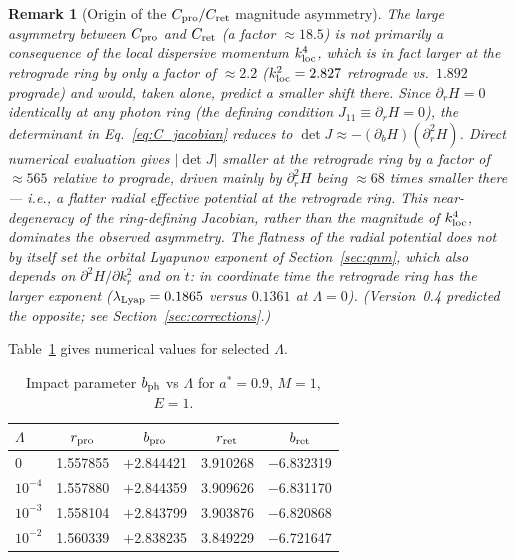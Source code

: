 \documentclass[12pt,a4paper]{article}
\newtheorem{remark}{Remark}
\newcommand{\lLyap}{\lambda_{\rm Lyap}}
\begin{document}
\begin{remark}[Origin of the $C_{\rm pro}/C_{\rm ret}$ magnitude asymmetry]
\label{rem:asymmetry}
The large asymmetry between $C_{\rm pro}$ and $C_{\rm ret}$
(a factor $\approx18.5$) is \emph{not} primarily a consequence of the
local dispersive momentum $k_{\rm loc}^4$, which is in fact larger
at the retrograde ring by only a factor of $\approx2.2$
($k_{\rm loc}^2=2.827$ retrograde vs.\ $1.892$ prograde) and would,
taken alone, predict a \emph{smaller} shift there. Since
$\partial_r H=0$ identically at any photon ring
(the defining condition $J_{11}\equiv\partial_r H=0$), the
determinant in Eq.~\eqref{eq:C_jacobian} reduces to
$\det J\approx-(\partial_b H)(\partial_r^2 H)$. Direct numerical
evaluation gives $|\det J|$ smaller at the retrograde ring by a
factor of $\approx565$ relative to prograde, driven mainly by
$\partial_r^2 H$ being $\approx68$ times smaller there --- i.e., a
flatter radial effective potential at the retrograde ring. This
near-degeneracy of the ring-defining Jacobian, rather than the
magnitude of $k_{\rm loc}^4$, dominates the observed asymmetry.
The flatness of the radial potential does not by itself set the
orbital Lyapunov exponent of Section~\ref{sec:qnm}, which also depends on
$\partial^2 H/\partial k_r^2$ and on $\dot t$: in coordinate time the retrograde
ring has the \emph{larger} exponent ($\lLyap=0.1865$ versus $0.1361$ at
$\Lambda=0$). (Version~0.4 predicted the opposite; see
Section~\ref{sec:corrections}.)
\end{remark}

Table~\ref{tab:pring} gives numerical values for selected $\Lambda$.

\begin{table}[h]
\centering
\caption{Impact parameter $b_{\rm ph}$ vs $\Lambda$ for $a^*=0.9$, $M=1$, $E=1$.}
\label{tab:pring}
\begin{tabular}{lcccc}
\toprule
$\Lambda$ & $r_{\rm pro}$ & $b_{\rm pro}$ & $r_{\rm ret}$ & $b_{\rm ret}$ \\
\midrule
$0$        & 1.557855 & $+$2.844421 & 3.910268 & $-$6.832319 \\
$10^{-4}$  & 1.557880 & $+$2.844359 & 3.909626 & $-$6.831170 \\
$10^{-3}$  & 1.558104 & $+$2.843799 & 3.903876 & $-$6.820868 \\
$10^{-2}$  & 1.560339 & $+$2.838235 & 3.849229 & $-$6.721647 \\
\bottomrule
\end{tabular}
\end{table}
\end{document}
